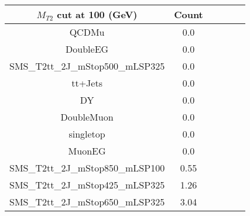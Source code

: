 \documentclass[8pt]{article}
\begin{document}
\begin{tabular}{|c|c|c|c|c|c|}
\hline
$M_{T2}$ cut at 100 (GeV) & Count \\
\hline
\hline
QCDMu & 0.0\\
DoubleEG & 0.0\\
SMS\_T2tt\_2J\_mStop500\_mLSP325 & 0.0\\
tt+Jets & 0.0\\
DY & 0.0\\
DoubleMuon & 0.0\\
singletop & 0.0\\
MuonEG & 0.0\\
SMS\_T2tt\_2J\_mStop850\_mLSP100 & 0.55\\
SMS\_T2tt\_2J\_mStop425\_mLSP325 & 1.26\\
SMS\_T2tt\_2J\_mStop650\_mLSP325 & 3.04\\
\hline
\hline
\end{tabular}
\end{document}
